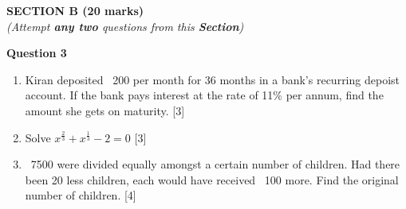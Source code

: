 \newpage
\begin{center}
   \large
   \textbf{SECTION B (20 marks)}\\
   \vspace{5mm}
   \normalsize
   \textit{(Attempt \textbf{any two} questions from this \textbf{Section})}
\end{center}
\par

\noindent
\textbf{Question 3}
\begin{enumerate}[label=(\roman*)]

    \item Kiran deposited \rupee~200 per month for 36 months in a bank's
        recurring depoist account. If the bank pays interest at the rate
        of 11\% per annum, find the amount she gets on maturity. \hfill [3]

    \item Solve $x^\frac23 + x^\frac13 -2 = 0$ \hfill [3]

    \item \rupee~7500 were divided equally amongst a certain number of
        children. Had there been 20 less children, each would have received
        \rupee~100 more. Find the original number of children. \hfill [4]

\end{enumerate}

